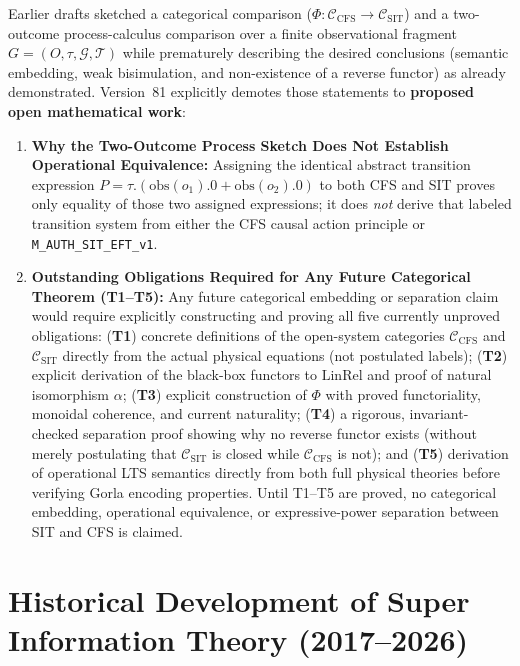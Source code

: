 Earlier drafts sketched a categorical comparison ($\Phi : \mathcal{C}_{\mathrm{CFS}} \to \mathcal{C}_{\mathrm{SIT}}$) and a two-outcome process-calculus comparison over a finite observational fragment $G = (O, \tau, \mathcal{G}, \mathcal{T})$ while prematurely describing the desired conclusions (semantic embedding, weak bisimulation, and non-existence of a reverse functor) as already demonstrated. Version~81 explicitly demotes those statements to \textbf{proposed open mathematical work}:
\begin{enumerate}[leftmargin=2em]
  \item \textbf{Why the Two-Outcome Process Sketch Does Not Establish Operational Equivalence:} Assigning the identical abstract transition expression $P = \tau.(\mathrm{obs}(o_1).0 + \mathrm{obs}(o_2).0)$ to both CFS and SIT proves only equality of those two assigned expressions; it does \emph{not} derive that labeled transition system from either the CFS causal action principle or \texttt{M\_AUTH\_SIT\_EFT\_v1}.
  \item \textbf{Outstanding Obligations Required for Any Future Categorical Theorem (T1--T5):} Any future categorical embedding or separation claim would require explicitly constructing and proving all five currently unproved obligations: (\textbf{T1}) concrete definitions of the open-system categories $\mathcal{C}_{\mathrm{CFS}}$ and $\mathcal{C}_{\mathrm{SIT}}$ directly from the actual physical equations (not postulated labels); (\textbf{T2}) explicit derivation of the black-box functors to $\mathrm{LinRel}$ and proof of natural isomorphism $\alpha$; (\textbf{T3}) explicit construction of $\Phi$ with proved functoriality, monoidal coherence, and current naturality; (\textbf{T4}) a rigorous, invariant-checked separation proof showing why no reverse functor exists (without merely postulating that $\mathcal{C}_{\mathrm{SIT}}$ is closed while $\mathcal{C}_{\mathrm{CFS}}$ is not); and (\textbf{T5}) derivation of operational LTS semantics directly from both full physical theories before verifying Gorla encoding properties. Until T1--T5 are proved, no categorical embedding, operational equivalence, or expressive-power separation between SIT and CFS is claimed.
\end{enumerate}



\section{Historical Development of Super Information Theory (2017--2026)}
\label{app:historical-development}

